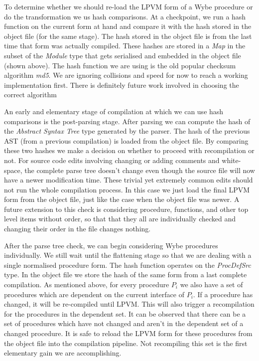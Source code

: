 To determine whether we should re-load the LPVM form of a Wybe procedure or do
the transformation we us hash comparisons. At a checkpoint, we run a hash
function on the current form at hand and compare it with the hash stored in the
object file (for the same stage). The hash stored in the object file is from
the last time that form was actually compiled. These hashes are stored in a
\textit{Map} in the subset of the \textit{Module} type that gets serialised and
embedded in the object file (shown above). The hash function we are using is
the old popular checksum algorithm \textit{md5}. We are ignoring collisions and
speed for now to reach a working implementation first. There is definitely
future work involved in choosing the correct algorithm


An early and elementary stage of compilation at which we can use hash
comparisons is the post-parsing stage. After parsing we can compute the hash of
the \textit{Abstract Syntax Tree} type generated by the parser. The hash of the
previous AST (from a previous compilation) is loaded from the object file. By
comparing these two hashes we make a decision on whether to proceed with
recompilation or not. For source code edits involving changing or adding
comments and white-space, the complete parse tree doesn't change even though
the source file will now have a newer modification time. These trivial yet
extremely common edits should not run the whole compilation process. In this
case we just load the final LPVM form from the object file, just like the case
when the object file was newer. A future extension to this check is considering
procedure, functions, and other top level items without order, so that that
they all are individually checked and changing their order in the file changes
nothing.

After the parse tree check, we can begin considering Wybe procedures
individually. We still wait until the flattening stage so that we are dealing
with a single normalised procedure form. The hash function operates on the
\textit{ProcDefSrc} type. In the object file we store the hash of the same form
from a last complete compilation. As mentioned above, for every procedure $P_i$
we also have a set of procedures which are dependent on the current interface
of $P_i$. If a procedure has changed, it will be re-compiled until LPVM. This
will also trigger a recompilation for the procedures in the dependent set. It
can be observed that there can be a set of procedures which have not changed
and aren't in the dependent set of a changed procedure. It is safe to reload
the LPVM form for these procedures from the object file into the compilation
pipeline. Not recompiling this set is the first elementary gain we are
accomplishing.


